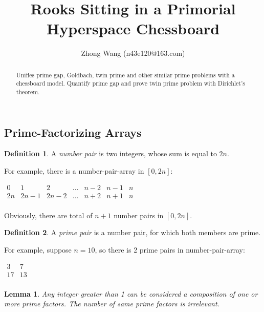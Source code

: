 \documentclass[twocolumn]{article}%
\newtheorem{lem}{Lemma}
\theoremstyle{definition}
\newtheorem{dfn}{Definition}
\theoremstyle{remark}
\begin{document}
\title{Rooks Sitting in a Primorial Hyperspace Chessboard}
\author{Zhong Wang (n43e120@163.com)}
\maketitle

\begin{abstract}
Unifies prime gap, Goldbach, twin prime and other similar prime problems  with a chessboard model. Quantify prime gap and prove twin prime problem with Dirichlet's theorem.
\end{abstract}

\subsection*{Prime-Factorizing Arrays}
\begin{dfn}
	A \emph{number pair} is two integers, whose sum is equal to $2n$.
\end{dfn}

For example, there is a number-pair-array in $[0, 2n]$:
\begin{center}
	\(\begin{array}{ccccccccccc}
		0 & 1 & 2 & \dots & n-2 & n-1 & n \\
		2n & 2n-1 & 2n-2 & \dots & n+2 & n+1 & n \\
	\end{array}\)
\end{center}

Obviously, there are total of $n+1$ number pairs in $[0, 2n]$.

\begin{dfn}
	A \emph{prime pair} is a number pair, for which both members are prime.
\end{dfn}

For example, suppose $n=10$, so there is 2 prime pairs in number-pair-array:

\begin{center}
	\(\begin{array}{cc}
		3 & 7 \\
		17 & 13 \\
	\end{array}\)
\end{center}

\begin{lem}\label{lemColorBall}
Any integer greater than 1 can be considered a composition of one or more prime factors. The number of same prime factors is irrelevant.
\end{lem}
\end{document}

